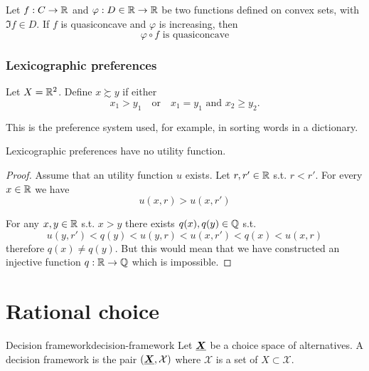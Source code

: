 \documentclass[12pt]{extarticle}
\renewcommand{\vec}[1]{\uvec{#1}}
\begin{document}
\begin{proposition}{}{}
    Let $f: C \to \mathbb{R}$ and $\varphi: D \in \mathbb{R} \to \mathbb{R}$ be two functions defined on convex sets, with $\Im f \in D$.
    If $f$ is quasiconcave and $\varphi$ is increasing, then
    \begin{equation}
        \varphi \circ f \text{ is quasiconcave}
    \end{equation}
\end{proposition}

\subsubsection{Lexicographic preferences}

Let $X = \mathbb{R}^2$. Define $x \succsim y$ if either
\begin{equation}
    x_1 > y_1 \quad \text{or} \quad x_1 = y_1 \text{ and } x_2 \geq y_2.
\end{equation}

This is the preference system used, for example, in sorting words in a dictionary.

\begin{proposition}{}{}
    Lexicographic preferences have no utility function.
\end{proposition}

\begin{proof}
    Assume that an utility function $u$ exists.
    Let $r, r' \in \mathbb{R}$ s.t. $r < r'$.
    For every $x \in \mathbb{R}$ we have
    \begin{equation}
        u(x, r) > u(x, r')
    \end{equation}

    For any $x, y \in \mathbb{R}$ s.t. $x > y$ there exists $q(x), q(y) \in \mathbb{Q}$ s.t.
    \begin{equation}
        u(y, r') < q(y) < u(y, r) < u(x, r') < q(x) < u(x, r)
    \end{equation}
    therefore $q(x) \ne q(y)$.
    But this would mean that we have constructed an injective function $q : \mathbb{R} \to \mathbb{Q}$ which is impossible.
\end{proof}

\section{Rational choice}

\begin{definition}{Decision framework}{decision-framework}
    Let $\vec X$ be a choice space of alternatives.
    A decision framework is the pair $(\vec X,\mathcal X)$ where $\mathcal X$ is a set of $X \subset \mathcal X$.
\end{definition}
\end{document}
